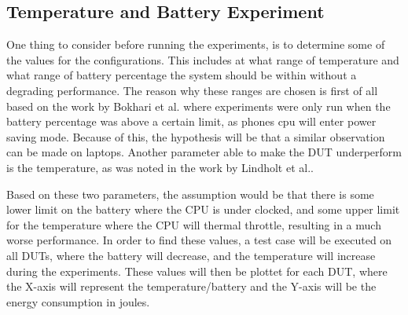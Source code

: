 \subsection{Temperature and Battery Experiment}

One thing to consider before running the experiments, is to determine some of the values for the configurations. This includes at what range of temperature and what range of battery percentage the system should be within without a degrading performance. The reason why these ranges are chosen is first of all based on the work by Bokhari et al.\cite*[]{Bokhari2020r3} where experiments were only run when the battery percentage was above a certain limit, as phones cpu will enter power saving mode. Because of this, the hypothesis will be that a similar observation can be made on laptops. Another parameter able to make the DUT underperform is the temperature, as was noted in the work by Lindholt et al.\cite*[]{Lindholt2022}. 

Based on these two parameters, the assumption would be that there is some lower limit on the battery where the CPU is under clocked, and some upper limit for the temperature where the CPU will thermal throttle, resulting in a much worse performance. In order to find these values, a test case will be executed on all DUTs, where the battery will decrease, and the temperature will increase during the experiments. These values will then be plottet for each DUT, where the X-axis will represent the temperature/battery and the Y-axis will be the energy consumption in joules.